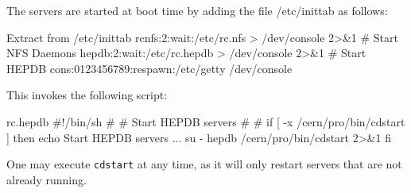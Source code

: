 The servers are started at boot time by adding the
file /etc/inittab as follows:

\begin{XMPt}{Extract from /etc/inittab}
rcnfs:2:wait:/etc/rc.nfs > /dev/console 2>&1 # Start NFS Daemons
hepdb:2:wait:/etc/rc.hepdb > /dev/console 2>&1 # Start HEPDB
cons:0123456789:respawn:/etc/getty /dev/console
\end{XMPt}

This invokes the following script:

\begin{XMPt}{rc.hepdb}
#!/bin/sh
#
#               Start HEPDB servers
#
#
if [ -x /cern/pro/bin/cdstart ]
then
        echo Start HEPDB servers ...
        su - hepdb /cern/pro/bin/cdstart 2>&1
fi
\end{XMPt}

One may execute {\tt cdstart} at any time, as it will only
restart servers that are not already running.

